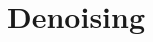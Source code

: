 \documentclass[11pt,compress,t,notes=noshow]{beamer}
\begin{document}

\section{Denoising}
\end{document}
